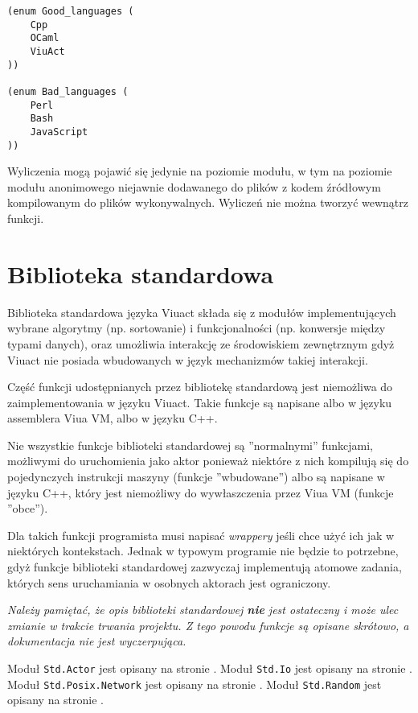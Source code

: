 \begin{lstlisting}
(enum Good_languages (
    Cpp
    OCaml
    ViuAct
))

(enum Bad_languages (
    Perl
    Bash
    JavaScript
))
\end{lstlisting}

Wyliczenia mogą pojawić się jedynie na poziomie modułu, w tym na poziomie modułu anonimowego niejawnie
dodawanego do plików z kodem źródłowym kompilowanym do plików wykonywalnych. Wyliczeń nie można tworzyć
wewnątrz funkcji.

\section{Biblioteka standardowa}

Biblioteka standardowa języka Viuact składa się z modułów implementujących wybrane algorytmy (np. sortowanie)
i funkcjonalności (np. konwersje między typami danych), oraz umożliwia interakcję ze środowiskiem zewnętrznym
gdyż Viuact nie posiada wbudowanych w język mechanizmów takiej interakcji.

Część funkcji udostępnianych przez bibliotekę standardową jest niemożliwa do zaimplementowania w języku
Viuact. Takie funkcje są napisane albo w języku assemblera Viua VM, albo w języku C++.

Nie wszystkie funkcje biblioteki standardowej są ''normalnymi'' funkcjami, możliwymi do uruchomienia jako
aktor ponieważ niektóre z nich kompilują się do pojedynczych instrukcji maszyny (funkcje ''wbudowane'') albo
są napisane w języku C++, który jest niemożliwy do wywłaszczenia przez Viua VM (funkcje ''obce'').

Dla takich funkcji programista musi napisać \emph{wrappery} jeśli chce użyć ich jak w niektórych kontekstach.
Jednak w typowym programie nie będzie to potrzebne, gdyż funkcje biblioteki standardowej zazwyczaj
implementują atomowe zadania, których sens uruchamiania w osobnych aktorach jest ograniczony.

\begin{center}
\emph{Należy pamiętać, że opis biblioteki standardowej \textbf{nie} jest ostateczny i może ulec zmianie w
trakcie trwania projektu. Z tego powodu funkcje są opisane skrótowo, a dokumentacja nie jest wyczerpująca.}
\end{center}

Moduł \texttt{Std.Actor} jest opisany na stronie \pageref{stdlib_Std_Actor}.
Moduł \texttt{Std.Io} jest opisany na stronie \pageref{stdlib_Std_Io}.
Moduł \texttt{Std.Posix.Network} jest opisany na stronie \pageref{stdlib_Std_Posix_Network}.
Moduł \texttt{Std.Random} jest opisany na stronie \pageref{stdlib_Std_Random}.

